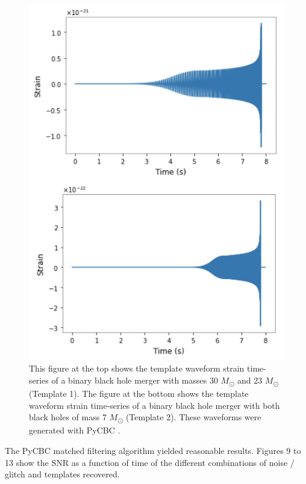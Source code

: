 \documentclass[reprint,
letterpaper,
 amsmath,amssymb,
 aps,
]{revtex4-2}
\begin{document}
\begin{figure}[h]
\caption{This figure at the top shows the template waveform strain time-series of a binary black hole merger with masses 30 $M$\textsubscript{\(\odot\)} and 23 $M$\textsubscript{\(\odot\)} (Template 1). The figure at the bottom shows the template waveform strain time-series of a binary black hole merger with both black holes of mass 7 $M$\textsubscript{\(\odot\)} (Template 2). These waveforms were generated with PyCBC \cite{pycbc}.}
\includegraphics[scale = 1]{templates.png}
\centering
\end{figure} 

The PyCBC matched filtering algorithm yielded reasonable results. Figures 9 to 13 show the SNR as a function of time of the different combinations of noise / glitch and templates recovered.
\end{document}
